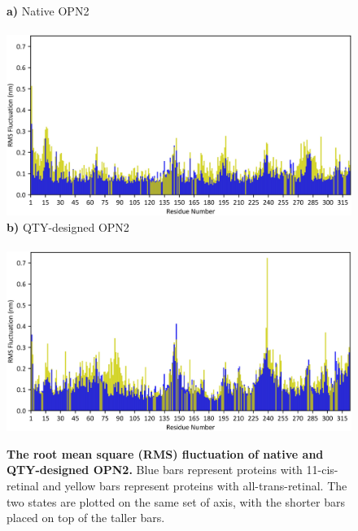 \documentclass[fleqn,12pt]{supp}
\begin{document}
\begin{figure}[H]
    \caption{\textbf{The root mean square (RMS) fluctuation of native and QTY-designed OPN2. } Blue bars represent proteins with 11-cis-retinal and yellow bars represent proteins with all-trans-retinal. The two states are plotted on the same set of axis, with the shorter bars placed on top of the taller bars. }
    \textbf{a)} Native OPN2 \\ \\
    \includegraphics[width=\linewidth]{SuppFigures/wt rmsf.jpg}
    \textbf{b)} QTY-designed OPN2 \\ \\
    \includegraphics[width=\linewidth]{SuppFigures/qty rmsf.jpg}
\end{figure}
\end{document}
